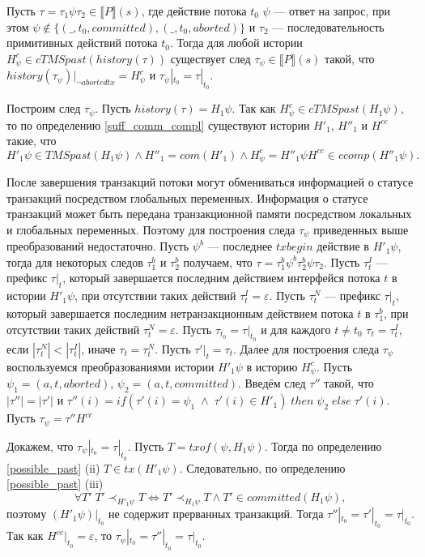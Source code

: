 \begin{lemma}\label{sufficiency1}
Пусть $\tau = \tau_1\psi\tau_2 \in \llbracket P \rrbracket (s)$, где действие потока $t_0$ $\psi$ --- ответ на запрос, при этом $\psi \notin \{(\_, t_0, committed),(\_,t_0, aborted)\}$ и $\tau_2$ --- последовательность примитивных действий потока $t_0$. Тогда для любой истории $H^c_{\psi} \in cTMSpast(history(\tau))$ существует след $\tau_{\psi} \in \llbracket P \rrbracket (s)$ такой, что $history(\tau_{\psi})|_{\neg abortedtx} = H^c_{\psi}$ и $\tau_{\psi}|_{t_0} = \tau|_{t_0}$. 
\end{lemma}
\begin{myproof}
Построим след $\tau_{\psi}$. Пусть $history(\tau) = H_1\psi$. Так как $H^c_{\psi} \in cTMSpast(H_1\psi)$, то по определению \ref{suff_comm_compl} существуют истории $H'_1$, $H''_1$ и $H^{cc}$ такие, что $$H'_1\psi \in TMSpast(H_1\psi) \land H''_1 = com(H'_1) \land H^c_{\psi} = H''_1{\psi}H^{cc} \in ccomp(H''_1\psi).$$

После завершения транзакций потоки могут обмениваться информацией о статусе транзакций посредством глобальных переменных. Информация о статусе транзакций может быть передана транзакционной памяти посредством локальных и глобальных переменных. Поэтому для построения следа $\tau_{\psi}$ приведенных выше преобразований недостаточно. Пусть $\psi^b$ --- последнее $txbegin$ действие в $H'_1\psi$, тогда для некоторых следов $\tau^b_1$ и $\tau^b_2$ получаем, что $\tau = \tau^b_1\psi^b\tau^b_2\psi\tau_2$. Пусть $\tau^I_t$ --- префикс $\tau|_t$, который завершается последним действием интерфейся потока $t$ в истории $H'_1\psi$, при отсутствии таких действий $\tau^I_t = \varepsilon$. Пусть $\tau^N_t$ --- префикс $\tau|_t$, который завершается последним нетранзакционным действием потока $t$ в $\tau^b_1$, при отсутствии таких действий $\tau^N_t = \varepsilon$. Пусть $\tau_{t_0} = \tau|_{t_0}$ и для каждого $t \neq t_0$ $\tau_t = \tau^I_t$, если $|\tau^N_t| < |\tau^I_t|$, иначе $\tau_t = \tau^N_t$. Пусть $\tau'|_t = \tau_t$. Далее для построения следа $\tau_{\psi}$ воспользуемся преобразованиями истории $H'_1\psi$ в историю $H^c_{\psi}$. Пусть $\psi_1 = (a, t, aborted)$, $\psi_2 = (a, t, committed)$. Введём след $\tau''$ такой, что $|\tau''| = |\tau'|$ и $ \tau''(i) = if \left (\tau'(i) = \psi_1 \; \land \; \tau'(i) \in H'_1 \right) \; then \; \psi_2 \; else \; \tau'(i).$ Пусть $\tau_{\psi} = \tau''H^{cc}$

Докажем, что $\tau_{\psi}|_{t_0} = \tau|_{t_0}$. Пусть $T = txof(\psi, H_1\psi)$. Тогда по определению \ref{possible_past} \; (ii) $T \in tx(H'_1\psi)$. Следовательно, по определению \ref{possible_past} \; (iii) \begin{equation}\label{eq:transform4iii}
\forall T' \; T' \prec_{H'_1\psi} T \iff T' \prec_{H_1\psi} T \land T' \in committed(H_1\psi),
\end{equation}
поэтому $(H'_1\psi)|_{t_0}$ не содержит прерванных транзакций. Тогда $\tau''|_{t_0} = \tau'|_{t_0} = \tau|_{t_0}$. Так как $H^{cc}|_{t_0} = \varepsilon$, то $\tau_{\psi}|_{t_0} = \tau''|_{t_0} = \tau|_{t_0}.$


\end{myproof}
